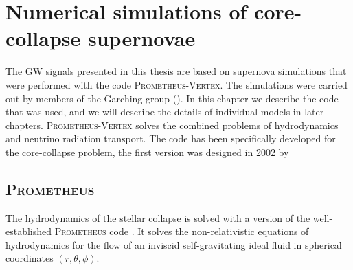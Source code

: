 
\chapter{Numerical simulations of core-collapse supernovae} \label{ch:numerics}
The GW signals presented in this thesis are based on 
supernova simulations that were performed with the code \textsc{Prometheus-Vertex}.
The simulations were carried out by members of the Garching-group 
(\cite{hanke_phd,melson_phd,suma_models}).
In this chapter we describe the code that was used, and we will
describe the details of individual models in later chapters. 
\textsc{Prometheus-Vertex} solves the combined problems of hydrodynamics and neutrino radiation transport.
The code has been specifically developed for the core-collapse problem,
the first version was designed in 2002 by \cite{rampp_02} 

\section{\textsc{Prometheus}}
The hydrodynamics of the stellar collapse is solved with a version of the
well-established \textsc{Prometheus} code \citep{mueller_91,fryxell_91}. It solves the non-relativistic 
equations of hydrodynamics for the flow of an inviscid self-gravitating ideal fluid in spherical coordinates $(r,\theta,\phi)$.
